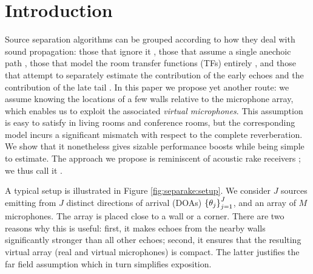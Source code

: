 



\section{Introduction}

Source separation algorithms can be grouped according to how they deal with sound propagation:
those that ignore it \cite{le2015deep}, those that assume a single anechoic path \cite{rickard2007duet},
those that model the room transfer functions (TFs) entirely \cite{ozerov2010multichannel,nugraha2016multichannel},
and those that attempt to separately estimate the contribution of the early echoes and the contribution of the late tail \cite{leglaive2015multichannel}.
In this paper we propose yet another route: we assume knowing the locations of a few walls relative to the microphone array,
which enables us to exploit the associated \textit{virtual microphones}.
This assumption is easy to satisfy in living rooms and conference rooms, but the corresponding model incurs a significant mismatch with respect to the complete reverberation.
We show that it nonetheless gives sizable performance boosts while being simple to estimate.
The approach we propose is reminiscent of acoustic rake receivers \cite{Dokmanic:2015dr};
we thus call it \separake.

A typical setup is illustrated in Figure \ref{fig:separake:setup}.
We consider $J$ sources emitting from $J$ distinct directions of arrival (DOAs) $\set{\theta_j}_{j=1}^J$,
and an array of $M$ microphones.
The array is placed close to a wall or a corner.
There are two reasons why this is useful:
first, it makes echoes from the nearby walls significantly stronger than all other echoes;
second, it ensures that the resulting virtual array (real and virtual microphones) is compact.
The latter justifies the far field assumption which in turn simplifies exposition.

